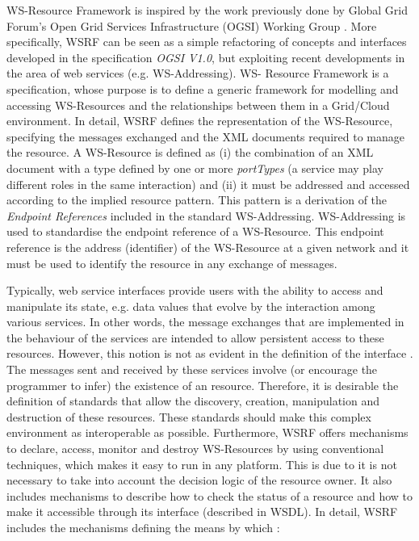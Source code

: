 WS-Resource Framework is inspired by the work previously done by Global Grid Forum's 
Open Grid Services Infrastructure (OGSI) Working Group \cite{Foster03}. More specifically,
WSRF can be seen as a simple refactoring of concepts and interfaces 
developed in the specification \emph{OGSI V1.0}, but
exploiting recent developments in the area of web services (e.g. WS-Addressing). 
WS- Resource Framework \cite{BAN06} is a specification, whose purpose is to define a 
generic framework for modelling and accessing WS-Resources and the relationships 
between them in a Grid/Cloud environment. In detail, WSRF defines 
the representation of the WS-Resource, specifying the messages exchanged and 
the XML documents required to manage the resource. 
A WS-Resource is defined as (i) the combination of an XML document with a type defined
by one or more \emph{portTypes} (a service may play different roles in the same interaction) and (ii) it must 
be addressed and accessed according to the implied resource pattern. This pattern is a derivation 
of the \emph{Endpoint References} included in the standard WS-Addressing. 
WS-Addressing is used to standardise the endpoint reference  of a WS-Resource. This endpoint
reference is the address (identifier) of the WS-Resource at
a given network and it must be used to identify the resource in any exchange of messages. 

Typically, web service interfaces provide users with the ability to access and manipulate its state, e.g. data values
that evolve by the interaction among various services. In other words, 
the message exchanges that are implemented in the behaviour of the services 
are intended to allow persistent access to these resources. However, this notion is not 
as evident in the definition of the interface \cite{Fost04}. The messages sent and received 
by these services involve (or encourage the programmer to infer) the existence of an resource. 
Therefore, it is desirable the definition of standards that allow the discovery, 
creation, manipulation and destruction of these resources. These standards should make this 
complex environment as interoperable as possible. Furthermore, 
WSRF offers mechanisms to declare, access, monitor and destroy WS-Resources by using conventional techniques, 
which makes it easy to run in any platform. This is due to it is not necessary to take into account the decision logic of the resource owner.
It also includes mechanisms to describe how to check the status of a resource 
and how to make it accessible through its interface (described in WSDL). 
In detail, WSRF includes the mechanisms defining the means by which \cite{}:

